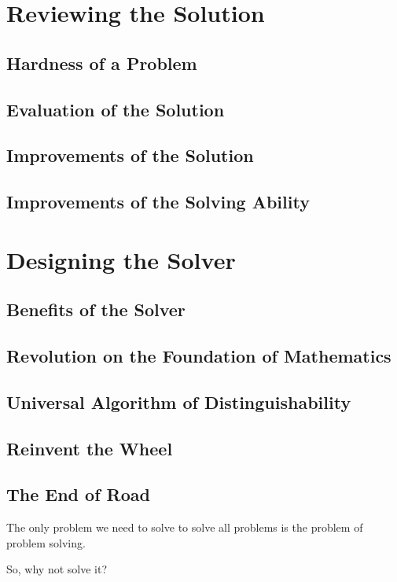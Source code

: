 \section{Reviewing the Solution}
\subsection{Hardness of a Problem}
\subsection{Evaluation of the Solution}
\subsection{Improvements of the Solution}
\subsection{Improvements of the Solving Ability}




\section{Designing the Solver}
\subsection{Benefits of the Solver}
\subsection{Revolution on the Foundation of Mathematics}
\subsection{Universal Algorithm of Distinguishability}
\subsection{Reinvent the Wheel}
\subsection{The End of Road}

The only problem we need to solve to solve all problems is the problem of problem solving.

So, why not solve it?
